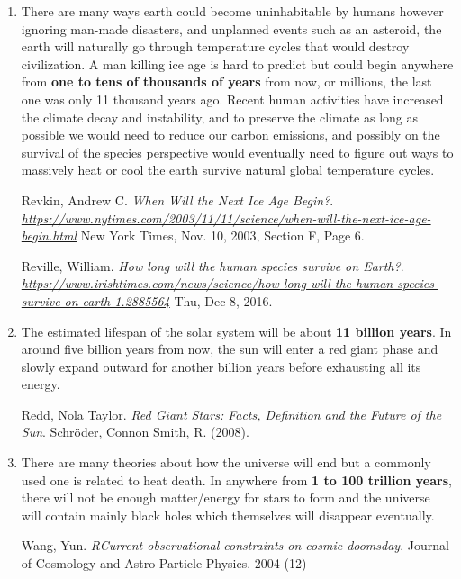 \documentclass{article}
\begin{document}
\begin{enumerate}
\begin{enumerate}
    \item There are many ways earth could become uninhabitable by humans however ignoring man-made disasters, and unplanned events such as an asteroid, the earth will naturally go through temperature cycles that would destroy civilization. A man killing ice age is hard to predict but could begin anywhere from \textbf{one to tens of thousands of years} from now, or millions, the last one was only 11 thousand years ago. Recent human activities have increased the climate decay and instability, and to preserve the climate as long as possible we would need to reduce our carbon emissions, and possibly on the survival of the species perspective would eventually need to figure out ways to massively heat or cool the earth survive natural global temperature cycles.
    \begin{itemize}
      Revkin, Andrew C.
      \textit{When Will the Next Ice Age Begin?}.
      \textit{\href{https://www.nytimes.com/2003/11/11/science/when-will-the-next-ice-age-begin.html}{https://www.nytimes.com/2003/11/11/science/when-will-the-next-ice-age-begin.html}}
      New York Times, Nov. 10, 2003, Section F, Page 6.
    \end{itemize}
    \begin{itemize}
      Reville, William.
      \textit{How long will the human species survive on Earth?}.
      \textit{\href{https://www.irishtimes.com/news/science/how-long-will-the-human-species-survive-on-earth-1.2885564}{https://www.irishtimes.com/news/science/how-long-will-the-human-species-survive-on-earth-1.2885564}}
      Thu, Dec 8, 2016.
    \end{itemize}

    \item The estimated lifespan of the solar system will be about \textbf{11 billion years}. In around five billion years from now, the sun will enter a red giant phase and slowly expand outward for another billion years before exhausting all its energy.
    \begin{itemize}
      Redd, Nola Taylor.
      \textit{Red Giant Stars: Facts, Definition and the Future of the Sun}.
      Schröder, Connon Smith, R. (2008).
    \end{itemize}

    \item There are many theories about how the universe will end but a commonly used one is related to heat death. In anywhere from \textbf{1 to 100 trillion years}, there will not be enough matter/energy for stars to form and the universe will contain mainly black holes which themselves will disappear eventually.
    \begin{itemize}
      Wang, Yun.
      \textit{RCurrent observational constraints on cosmic doomsday}.
      Journal of Cosmology and Astro-Particle Physics. 2004 (12)
    \end{itemize}


\end{enumerate}
\end{enumerate}
\end{document}
